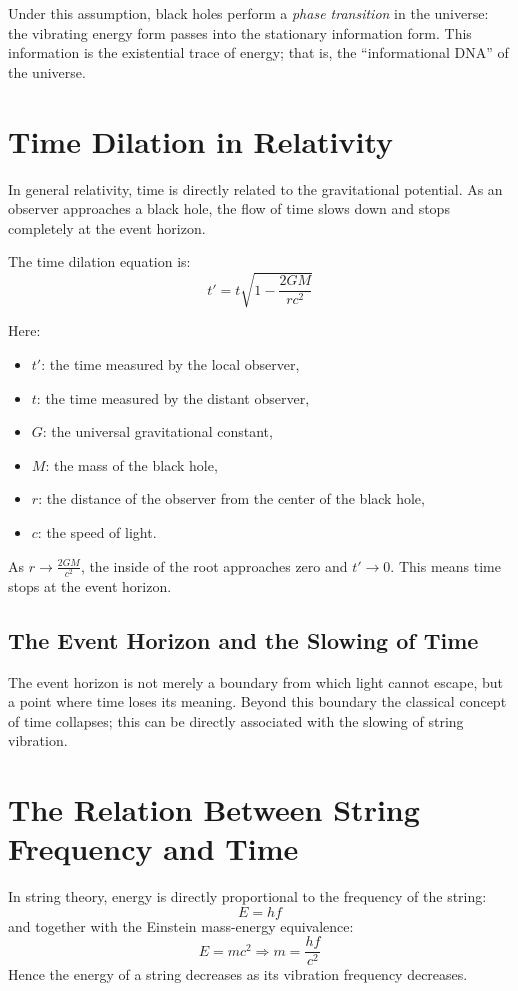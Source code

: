 \documentclass[12pt,a4paper]{article}
\begin{document}
Under this assumption, black holes perform a \textit{phase transition} in the universe:
the vibrating energy form passes into the stationary information form.
This information is the existential trace of energy; that is, the ``informational DNA'' of the universe.

\section{Time Dilation in Relativity}

In general relativity, time is directly related to the gravitational potential.
As an observer approaches a black hole, the flow of time slows down and stops completely at the event horizon.

The time dilation equation is:
\begin{equation}
t' = t \sqrt{1 - \frac{2GM}{r c^2}}
\end{equation}

Here:
\begin{itemize}
\item $t'$: the time measured by the local observer,
\item $t$: the time measured by the distant observer,
\item $G$: the universal gravitational constant,
\item $M$: the mass of the black hole,
\item $r$: the distance of the observer from the center of the black hole,
\item $c$: the speed of light.
\end{itemize}

As $r \to \frac{2GM}{c^2}$, the inside of the root approaches zero and $t' \to 0$.
This means time stops at the event horizon.

\subsection{The Event Horizon and the Slowing of Time}
The event horizon is not merely a boundary from which light cannot escape, but a point where time loses its meaning.
Beyond this boundary the classical concept of time collapses; this can be directly associated with the slowing of string vibration.

\section{The Relation Between String Frequency and Time}
In string theory, energy is directly proportional to the frequency of the string:
\begin{equation}
E = h f
\end{equation}
and together with the Einstein mass-energy equivalence:
\begin{equation}
E = mc^2 \Rightarrow m = \frac{h f}{c^2}
\end{equation}
Hence the energy of a string decreases as its vibration frequency decreases.
\end{document}
